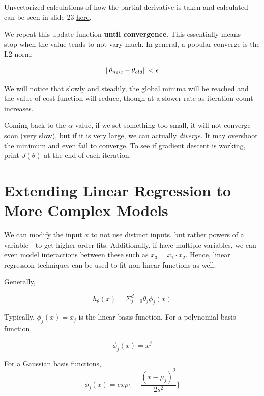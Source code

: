 Unvectorized calculations of how the partial derivative is taken and calculated can be seen in slide 23 \href{https://github.com/RoboticsIIITH/summer-sessions-2020/blob/master/lecture-slides/deep_learning/linear_regression.pdf}{here}.

We repeat this update function \textbf{until convergence}. This essentially means - stop when the value tends to not vary much. In general, a popular converge is the L2 norm:

\begin{equation}
    \left\lVert\theta_{new} - \theta_{old}\right\rVert < \epsilon
\end{equation}

We will notice that slowly and steadily, the global minima will be reached and the value of cost function will reduce, though at a slower rate as iteration count increases.

Coming back to the $\alpha$ value, if we set something too small, it will not converge soon (very slow), but if it is very large, we can actually \textit{diverge}. It may overshoot the minimum and even fail to converge. To see if gradient descent is working, print $J(\theta)$ at the end of each iteration. 

\section{Extending Linear Regression to More Complex Models}

We can modify the input $x$ to not use distinct inputs, but rather powers of a variable - to get higher order fits. Additionally, if have multiple variables, we can even model interactions between these such as $x_3 = x_1\cdot x_2$. Hence, linear regression techniques can be used to fit non linear functions as well.

Generally, 

\begin{equation}
    h_{\theta}(x) = \Sigma_{j=0}^{d} \theta_j \phi_j (x)
\end{equation}

Typically, $\phi_j(x)=x_j$ is the linear basis function. For a polynomial basis function,

\begin{equation}
    \phi_j(x) = x^j
\end{equation}

For a Gaussian basis functions,
\begin{equation}
    \phi_j(x) = exp\Big\{ -\frac{(x-\mu_j)^2}{2s^2} \Big\}
\end{equation}

